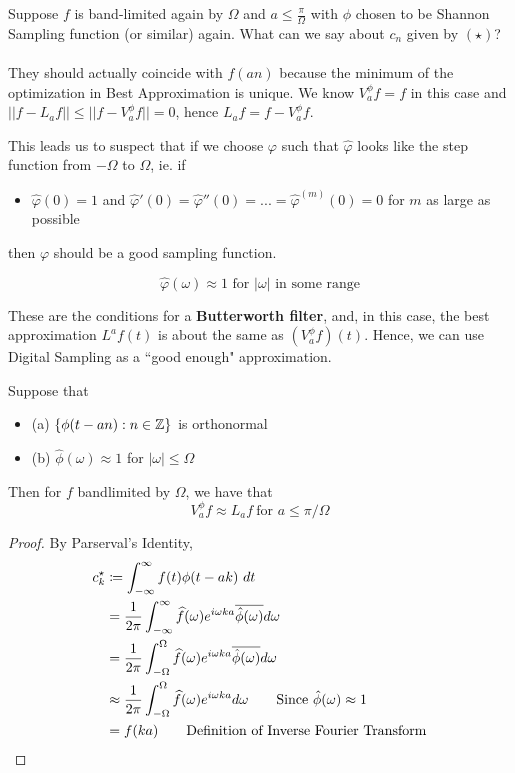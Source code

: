 \documentclass{article}
\begin{document}
\begin{remark}
    Suppose $f$ is band-limited again by $\Omega$ and $a \leq \frac{\pi}{\Omega}$ with $\phi$ chosen to be Shannon Sampling function (or similar) again. What can we say about $c_n$ given by $(\star)$?\\\\
    They should actually coincide with $f(an)$ because the minimum of the optimization in Best Approximation is unique. We know $V^\phi_a f = f$ in this case and $||f - L_a f|| \leq ||f - V^{\phi}_a f|| = 0$, hence $L_a f = f - V^\phi_a f$.
\end{remark}

This leads us to suspect that if we choose $\varphi$ such that $\hat{\varphi}$ looks like the step function from $-\Omega$ to $\Omega$, ie. if
\begin{itemize}
    \item $\hat{\varphi}(0) = 1$ and $\hat{\varphi}'(0) = \hat{\varphi}''(0) = ... = \hat{\varphi}^{(m)}(0) = 0$ for $m$ as large as possible
\end{itemize}
then $\varphi$ should be a good sampling function.

\[\hat{\varphi}(\omega) \approx 1 \text{ for } |\omega| \text{ in some range}\]

These are the conditions for a \textbf{Butterworth filter}, and, in this case, the best approximation $L^a f(t)$ is about the same as $(V^\phi_a f)(t)$. Hence, we can use Digital Sampling as a ``good enough" approximation.

\begin{theorem}
    Suppose that
    \begin{itemize}
        \item (a) $\{\phi(t - an): n \in \mathbb{Z}\}$ is orthonormal
        \item (b) $\hat{\phi}(\omega) \approx 1$ for $|\omega| \leq \Omega$
    \end{itemize}
    Then for $f$ bandlimited by $\Omega$, we have that
    \[V^\phi_a f \approx L_a f\ \text{for } a \leq \pi/\Omega\]
\end{theorem}

\begin{proof}
By Parserval's Identity, 
    \begin{align*}
        c_k^{\star} &\coloneqq \int_{-\infty}^\infty f(t) \phi(t - ak)\ dt\\
        &= \frac{1}{2\pi} \int_{-\infty}^\infty \widehat{f}(\omega) e^{i\omega k a} \overline{\hat{\phi}(\omega)} d\omega\\
        &= \frac{1}{2\pi} \int_{-\Omega}^\Omega \widehat{f}(\omega) e^{i\omega k a} \overline{\hat{\phi}(\omega)} d\omega\\
        &\approx \frac{1}{2\pi}  \int_{-\Omega}^\Omega \widehat{f}(\omega) e^{i\omega k a} d\omega \tag*{Since $\hat{\phi}(\omega) \approx 1$}\\
        &= f(ka) \tag*{Definition of Inverse Fourier Transform}
    \end{align*}
\end{proof}
\end{document}
